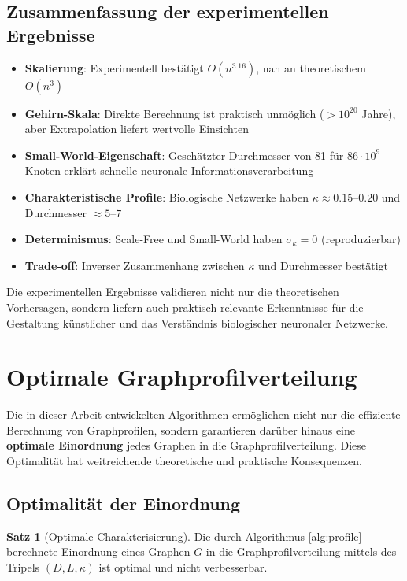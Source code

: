 ﻿\documentclass[a4paper,12pt]{article}
\theoremstyle{definition}
\newtheorem{satz}{Satz}
\begin{document}
	\subsection{Zusammenfassung der experimentellen Ergebnisse}
	
	\begin{itemize}
		\item[-] \textbf{Skalierung}: Experimentell bestätigt $O(n^{3.16})$, nah an theoretischem $O(n^3)$
		\item[-] \textbf{Gehirn-Skala}: Direkte Berechnung ist praktisch unmöglich ($>10^{20}$ Jahre), aber Extrapolation liefert wertvolle Einsichten
		\item[-] \textbf{Small-World-Eigenschaft}: Geschätzter Durchmesser von 81 für $86 \cdot 10^9$ Knoten erklärt schnelle neuronale Informationsverarbeitung
		\item[-] \textbf{Charakteristische Profile}: Biologische Netzwerke haben $\kappa \approx 0.15\text{--}0.20$ und Durchmesser $\approx 5\text{--}7$
		\item[-] \textbf{Determinismus}: Scale-Free und Small-World haben $\sigma_\kappa = 0$ (reproduzierbar)
		\item[-] \textbf{Trade-off}: Inverser Zusammenhang zwischen $\kappa$ und Durchmesser bestätigt
	\end{itemize}
	
	Die experimentellen Ergebnisse validieren nicht nur die theoretischen Vorhersagen, sondern liefern auch praktisch relevante Erkenntnisse für die Gestaltung künstlicher und das Verständnis biologischer neuronaler Netzwerke.
	
	\section{Optimale Graphprofilverteilung}
	
	Die in dieser Arbeit entwickelten Algorithmen ermöglichen nicht nur die effiziente Berechnung von Graphprofilen, sondern garantieren darüber hinaus eine \textbf{optimale Einordnung} jedes Graphen in die Graphprofilverteilung. Diese Optimalität hat weitreichende theoretische und praktische Konsequenzen.
	
	\subsection{Optimalität der Einordnung}
	
	\begin{satz}[Optimale Charakterisierung]
		Die durch Algorithmus \ref{alg:profile} berechnete Einordnung eines Graphen $G$ in die Graphprofilverteilung mittels des Tripels $(D, L, \kappa)$ ist optimal und nicht verbesserbar.
	\end{satz}
	
\end{document}
